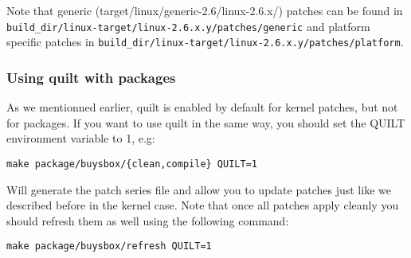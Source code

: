 Note that generic (target/linux/generic-2.6/linux-2.6.x/) patches can be found in 
\texttt{build\_dir/linux-target/linux-2.6.x.y/patches/generic} and platform specific
patches in \texttt{build\_dir/linux-target/linux-2.6.x.y/patches/platform}.

\subsubsection{Using quilt with packages}

As we mentionned earlier, quilt is enabled by default for kernel patches, but not for
packages. If you want to use quilt in the same way, you should set the QUILT environment
variable to 1, e.g:

\begin{Verbatim}
make package/buysbox/{clean,compile} QUILT=1
\end{Verbatim}

Will generate the patch series file and allow you to update patches just like we described
before in the kernel case. Note that once all patches apply cleanly you should refresh them
as well using the following command:

\begin{Verbatim}
make package/buysbox/refresh QUILT=1
\end{Verbatim}
